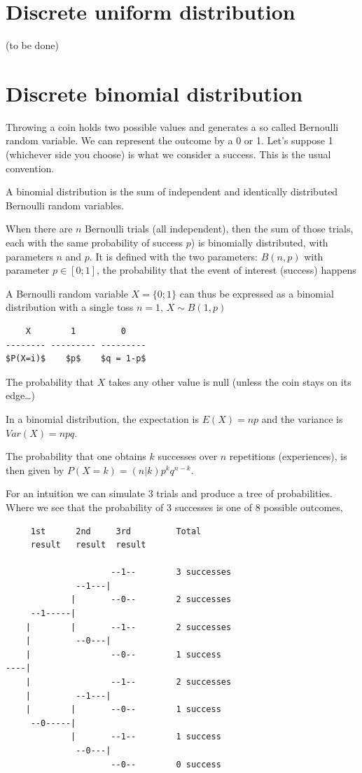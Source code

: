 \documentclass[
  letterpaper,
  DIV=11,
  numbers=noendperiod]{scrreprt}
\begin{document}
\section{Discrete uniform
distribution}\label{discrete-uniform-distribution}

(to be done)

\section{Discrete binomial
distribution}\label{discrete-binomial-distribution}

Throwing a coin holds two possible values and generates a so called
Bernoulli random variable. We can represent the outcome by a 0 or 1.
Let's suppose 1 (whichever side you choose) is what we consider a
success. This is the usual convention.

A binomial distribution is the sum of independent and identically
distributed Bernoulli random variables.

When there are \(n\) Bernoulli trials (all independent), then the sum of
those trials, each with the same probability of success \(p\)) is
binomially distributed, with parameters \(n\) and \(p\). It is defined
with the two parameters: \(B(n, p)\) with parameter \(p \in [0; 1]\),
the probability that the event of interest (success) happens

A Bernoulli random variable \(X = \{0 ;1\}\) can thus be expressed as a
binomial distribution with a single toss \(n=1\), \(X \sim B(1, p)\)

\begin{verbatim}
    X        1         0
-------- --------- ---------
$P(X=i)$    $p$    $q = 1-p$
\end{verbatim}

The probability that \(X\) takes any other value is null (unless the
coin stays on its edge\ldots)

In a binomial distribution, the expectation is \(E(X) = np\) and the
variance is \(Var(X) = npq\).

The probability that one obtains \(k\) successes over \(n\) repetitions
(experiences), is then given by \(P(X=k) = (n|k) p^k q^{n-k}\).

For an intuition we can simulate 3 trials and produce a tree of
probabilities. Where we see that the probability of 3 successes is one
of 8 possible outcomes,

\begin{verbatim}
     1st      2nd     3rd         Total
     result   result  result
     
                     --1--        3 successes
              --1---|
             |       --0--        2 successes
     --1-----|
    |        |       --1--        2 successes
    |         --0---|
    |                --0--        1 success
----|
    |                --1--        2 successes
    |         --1---|
    |        |       --0--        1 success
     --0-----|
             |       --1--        1 success
              --0---|
                     --0--        0 success
\end{verbatim}
\end{document}
